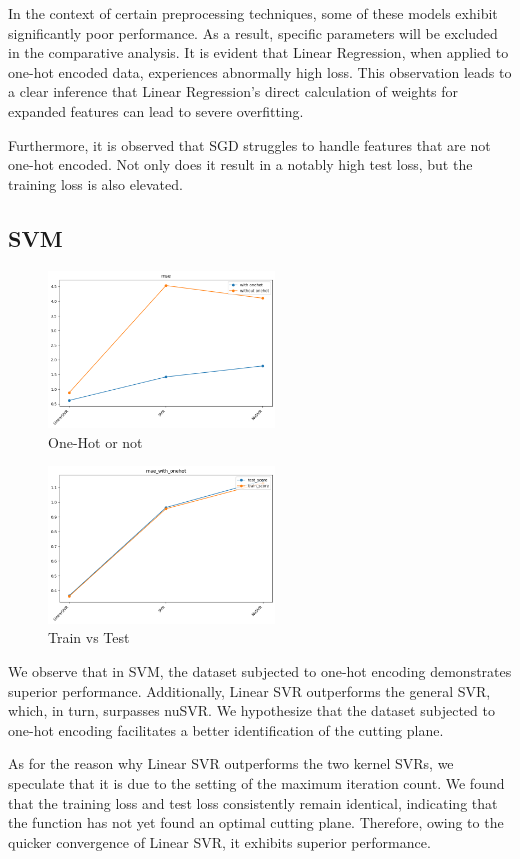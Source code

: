 \documentclass[twocolumn]{article}
\begin{document}
In the context of certain preprocessing techniques, some of these models exhibit significantly poor performance. As a result, specific parameters will be excluded in the comparative analysis. It is evident that Linear Regression, when applied to one-hot encoded data, experiences abnormally high loss. This observation leads to a clear inference that Linear Regression's direct calculation of weights for expanded features can lead to severe overfitting.

Furthermore, it is observed that SGD struggles to handle features that are not one-hot encoded. Not only does it result in a notably high test loss, but the training loss is also elevated.

	\subsection{SVM}
		\begin{figure}[H]
		\centering
		\includegraphics[width=6cm]{svm_mse.png} 
		\caption{One-Hot or not} 
		\label{Fig.svm_mse} 
		\end{figure}
		\begin{figure}[H]
		\centering
		\includegraphics[width=6cm]{svm_loss.png} 
		\caption{Train vs Test} 
		\label{Fig.svm_loss} 
		\end{figure}
	We observe that in SVM, the dataset subjected to one-hot encoding demonstrates superior performance. Additionally, Linear SVR outperforms the general SVR, which, in turn, surpasses nuSVR. We hypothesize that the dataset subjected to one-hot encoding facilitates a better identification of the cutting plane.

As for the reason why Linear SVR outperforms the two kernel SVRs, we speculate that it is due to the setting of the maximum iteration count. We found that the training loss and test loss consistently remain identical, indicating that the function has not yet found an optimal cutting plane. Therefore, owing to the quicker convergence of Linear SVR, it exhibits superior performance.
\end{document}
